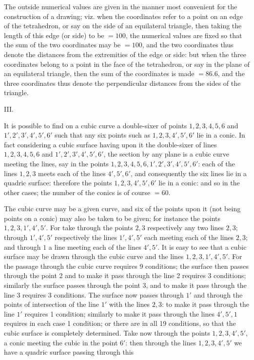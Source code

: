 \documentclass[11pt,a4paper]{article}
\begin{document}
The outside numerical values are given in the manner most convenient for the
construction of a drawing; viz. when the coordinates refer to a point on an edge of
the tetrahedron, or say on the side of an equilateral triangle, then taking the length
of this edge (or side) to be $=100$, the numerical values are fixed so that the sum of
the two coordinates may be $=100$, and the two coordinates thus denote the distances
from the extremities of the edge or side: but when the three coordinates belong to a
point in the face of the tetrahedron, or say in the plane of an equilateral triangle,
then the sum of the coordinates is made $=86.6$, and the three coordinates thus denote
the perpendicular distances from the sides of the triangle.

\begin{center}\textsc{III.}\end{center}

It is possible to find on a cubic curve a double-sixer of points
$1,2,3,4,5,6$ and $1',2',3',4',5',6'$ such that any six points such as
$1,2,3,4',5',6'$ lie in a conic. In fact considering a cubic surface having upon it
the double-sixer of lines $1,2,3,4,5,6$ and $1',2',3',4',5',6'$, the section by any plane
is a cubic curve meeting the lines, say in the points
$1,2,3,4,5,6,1',2',3',4',5',6'$: each of the lines $1,2,3$ meets each of the lines
$4',5',6'$, and consequently the six lines lie in a quadric surface: therefore the
points $1,2,3,4',5',6'$ lie in a conic: and so in the other cases; the number of the
conics is of course $=60$.

The cubic curve may be a given curve, and six of the points upon it (not being
points on a conic) may also be taken to be given; for instance the points
$1,2,3,1',4',5'$. For take through the points $2,3$ respectively any two lines $2,3$;
through $1',4',5'$ respectively the lines $1',4',5'$ each meeting each of the lines
$2,3$; and through $1$ a line meeting each of the lines $4',5'$. It is easy to see
that a cubic surface may be drawn through the cubic curve and the lines
$1,2,3,1',4',5'$. For the passage through the cubic curve requires 9 conditions; the
surface then passes through the point 2 and to make it pass through the line 2
requires 3 conditions; similarly the surface passes through the point 3, and to make
it pass through the line 3 requires 3 conditions. The surface now passes through $1'$
and through the points of intersection of the line $1'$ with the lines $2,3$: to make it
pass through the line $1'$ requires 1 condition; similarly to make it pass through the
lines $4',5',1$ requires in each case 1 condition; or there are in all 19 conditions, so
that the cubic surface is completely determined. Take now through the points
$1,2,3,4',5'$, a conic meeting the cubic in the point $6'$: then through the lines
$1,2,3,4',5'$ we have a quadric surface passing through this
\end{document}
